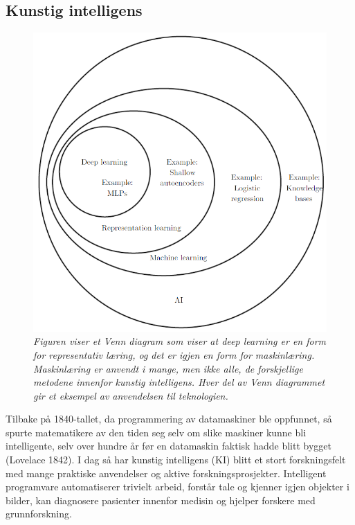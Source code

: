 \subsection{Kunstig intelligens}

\begin{figure} 
\begin{center} 
\includegraphics[scale=0.7]{figures/ai}
\caption{\small \sl Figuren viser et Venn diagram som viser at deep learning er en form for representativ læring, og det er igjen en form for maskinlæring. Maskinlæring er anvendt i mange, men ikke alle, de forskjellige metodene innenfor kunstig intelligens. Hver del av Venn diagrammet gir et eksempel av anvendelsen til teknologien. \cite{Goodfellow m.fl. 2016 s. 9} \label{fig:ai}} 
\end{center} 
\end{figure} 

Tilbake på 1840-tallet, da programmering av datamaskiner ble oppfunnet, så spurte matematikere av den tiden seg selv om slike maskiner kunne bli intelligente, selv over hundre år før en datamaskin faktisk hadde blitt bygget (Lovelace 1842). I dag så har kunstig intelligens (KI) blitt et stort forskningsfelt med mange praktiske anvendelser og aktive forskningsprosjekter. Intelligent programvare automatiserer trivielt arbeid, forstår tale og kjenner igjen objekter i bilder, kan diagnosere pasienter innenfor medisin og hjelper forskere med grunnforskning. \cite{Goodfellow m.fl. 2016 s. 1}

